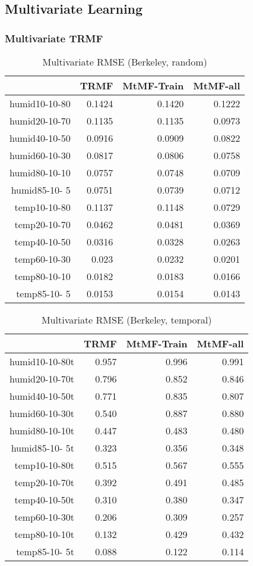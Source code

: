 
\subsection{Multivariate Learning}
\subsubsection{Multivariate TRMF}

\begin{table}[htbp]
\setlength{\tabcolsep}{2pt}
\centering
\caption{Multivariate RMSE (Berkeley, random)}
\label{traffic}
\begin{tabular}{r | r r r}
	&TRMF	&MtMF-Train	&MtMF-all \\ \hline
humid10-10-80	&0.1424	&0.1420	&0.1222\\
humid20-10-70	&0.1135	&0.1135	&0.0973\\
humid40-10-50	&0.0916	&0.0909	&0.0822\\
humid60-10-30	&0.0817	&0.0806	&0.0758\\
humid80-10-10	&0.0757	&0.0748	&0.0709\\
humid85-10- 5	&0.0751	&0.0739	&0.0712\\
 temp10-10-80	&0.1137	&0.1148	&0.0729\\
 temp20-10-70	&0.0462	&0.0481	&0.0369\\
 temp40-10-50	&0.0316	&0.0328	&0.0263\\
 temp60-10-30	&0.023	&0.0232	&0.0201\\
 temp80-10-10	&0.0182	&0.0183	&0.0166\\
 temp85-10- 5	&0.0153	&0.0154	&0.0143\\
\end{tabular}
\end{table}


\begin{table}[htbp]
\setlength{\tabcolsep}{2pt}
\centering
\caption{Multivariate RMSE (Berkeley, temporal)}
\label{traffic}
\begin{tabular}{r | r r r}
	&TRMF	&MtMF-Train	&MtMF-all \\ \hline
humid10-10-80t	&0.957&0.996& 	0.991\\
humid20-10-70t	&0.796&0.852& 	0.846\\
humid40-10-50t	&0.771&0.835& 	0.807\\
humid60-10-30t	&0.540&0.887& 	0.880\\
humid80-10-10t	&0.447&0.483& 	0.480\\
humid85-10- 5t	&0.323&0.356& 	0.348\\
 temp10-10-80t	&0.515&0.567& 	0.555\\
 temp20-10-70t	&0.392&0.491& 	0.485\\
 temp40-10-50t	&0.310&0.380& 	0.347\\
 temp60-10-30t	&0.206&0.309& 	0.257\\
 temp80-10-10t	&0.132&0.429& 	0.432\\
 temp85-10- 5t	&0.088&0.122& 	0.114\\
\end{tabular}
\end{table}

